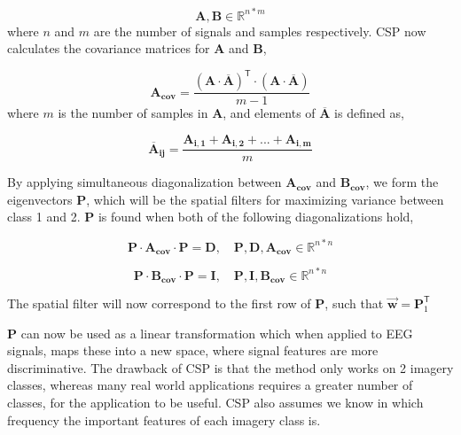 \begin{equation}
\label{eq:csp_data}
\pmb{A}, \mathbf{B} \in \mathbb{R}^{n*m}
\end{equation}
where $n$ and $m$ are the number of signals and samples respectively. CSP now calculates the covariance matrices for $\pmb{A}$ and $\pmb{B}$,

\begin{equation}
\label{eq:covariance_matrice}
\pmb{A_{cov}} = \frac{(\pmb{A} \cdot \overline{\pmb{A}})^\mathsf{T}  \cdot (\pmb{A} \cdot \overline{\pmb{A}})}{m - 1}
\end{equation}
where $m$ is the number of samples in $\pmb{A}$, and elements of $\overline{\pmb{A}}$ is defined as,

\begin{equation}
\label{eq:a_bar}
\pmb{\overline{A}_{ij}} = \frac{\pmb{A_{i,1}} + \pmb{A_{i,2}} + ... + \pmb{A_{i,m}}}{m}
\end{equation}

By applying simultaneous diagonalization between $\pmb{A_{cov}}$ and $\pmb{B_{cov}}$, we form the eigenvectors $\pmb{P}$, which will be the spatial filters for maximizing variance between class 1 and 2. $\pmb{P}$ is found when both of the following diagonalizations hold, 

\begin{equation}
\label{eq:diagonalization_A}
\pmb{P} \cdot \pmb{A_{cov}} \cdot \pmb{P} = \pmb{D}, \quad \pmb{P}, \pmb{D}, \pmb{A_{cov}} \in \mathbb{R}^{n*n}
\end{equation}

\begin{equation}
\label{eq:diagonalization_B}
\pmb{P} \cdot \pmb{B_{cov}} \cdot \pmb{P} = \pmb{I}, \quad \pmb{P}, \pmb{I}, \pmb{B_{cov}} \in \mathbb{R}^{n*n}
\end{equation}

The spatial filter will now correspond to the first row of $\pmb{P}$, such that $\pmb{\vec{w}} = \pmb{P}^\mathsf{T}_{1}$ 

$\pmb{P}$ can now be used as a linear transformation which when applied to EEG signals, maps these into a new space, where signal features are more discriminative. The drawback of CSP is that the method only works on 2 imagery classes, whereas many real world applications requires a greater number of classes, for the application to be useful. CSP also assumes we know in which frequency the important features of each imagery class is.

